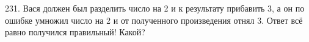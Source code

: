 231. Вася должен был разделить число на 2 и к результату прибавить 3, а он по ошибке умножил число на 2 и от полученного произведения отнял 3. Ответ всё равно получился правильный! Какой?\\
